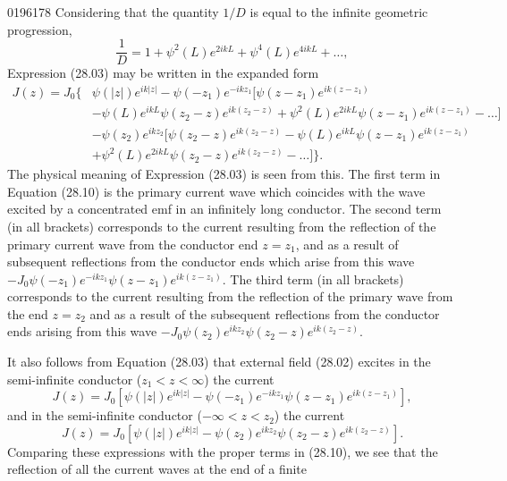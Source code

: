 \begin{scanpage}{0196}{178}
Considering that the quantity $1/D$ is equal to the infinite geometric progression,
\[
\frac1D=1+\psi^2(L)e^{2ikL}+\psi^4(L)e^{4ikL}+\ldots,\tag{28.09}
\]
Expression (28.03) may be written in the expanded form
\[
\begin{aligned}J(z)=J_0\bigl\{&\psi(|z|)e^{ik|z|}-\psi(-z_1)e^{-ikz_1}[\psi(z-z_1)e^{ik(z-z_1)}\\
&-\psi(L)e^{ikL}\psi(z_2-z)e^{ik(z_2-z)}+\psi^2(L)e^{2ikL}\psi(z-z_1)e^{ik(z-z_1)}-\ldots]\\
&-\psi(z_2)e^{ikz_2}[\psi(z_2-z)e^{ik(z_2-z)}-\psi(L)e^{ikL}\psi(z-z_1)e^{ik(z-z_1)}\\
&+\psi^2(L)e^{2ikL}\psi(z_2-z)e^{ik(z_2-z)}-\ldots]\bigr\}.
\end{aligned}\tag{28.10}
\]
The physical meaning of Expression (28.03) is seen from this. The first term in Equation (28.10) is the primary current wave which coincides with the wave excited by a concentrated emf in an infinitely long conductor. The second term (in all brackets) corresponds to the current resulting from the reflection of the primary current wave from the conductor end $z=z_1$, and as a result of subsequent reflections from the conductor ends which arise from this wave $-J_0\psi(-z_1)e^{-ikz_1}\psi(z-z_1)e^{ik(z-z_1)}$. The third term (in all brackets) corresponds to the current resulting from the reflection of the primary wave from the end $z=z_2$ and as a result of the subsequent reflections from the conductor ends arising from this wave $-J_0\psi(z_2)e^{ikz_2}\psi(z_2-z)e^{ik(z_2-z)}$.

It also follows from Equation (28.03) that external field (28.02) excites in the semi-infinite conductor ($z_1<z<\infty$) the current
\[
J(z)=J_0[\psi(|z|)e^{ik|z|}-\psi(-z_1)e^{-ikz_1}\psi(z-z_1)e^{ik(z-z_1)}],\tag{28.11}
\]
and in the semi-infinite conductor ($-\infty<z<z_2$) the current
\[
J(z)=J_0[\psi(|z|)e^{ik|z|}-\psi(z_2)e^{ikz_2}\psi(z_2-z)e^{ik(z_2-z)}].\tag{28.12}
\]
Comparing these expressions with the proper terms in (28.10), we see that the reflection of all the current waves at the end of a finite
\end{scanpage}

